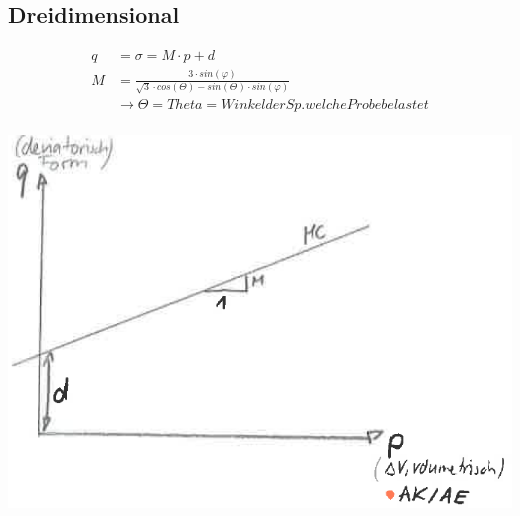 \begin{minipage}{0.6\linewidth}
	\subsection{Dreidimensional}
	\begin{align*}
		q			&= \sigma = M \cdot p + d \\
		M			&= \frac{3 \cdot sin(\varphi)}{\sqrt{3} \cdot cos(\Theta) - sin(\Theta) \cdot sin(\varphi)} \\
					& \rightarrow \Theta = Theta =Winkel der Sp. welche Probe belastet\\
	\end{align*}
\end{minipage}
\begin{minipage}{0.4\linewidth}
	\vspace{\baselineskip}
\includegraphics[width=\linewidth]{images/MC33draum.PNG}
\end{minipage}


